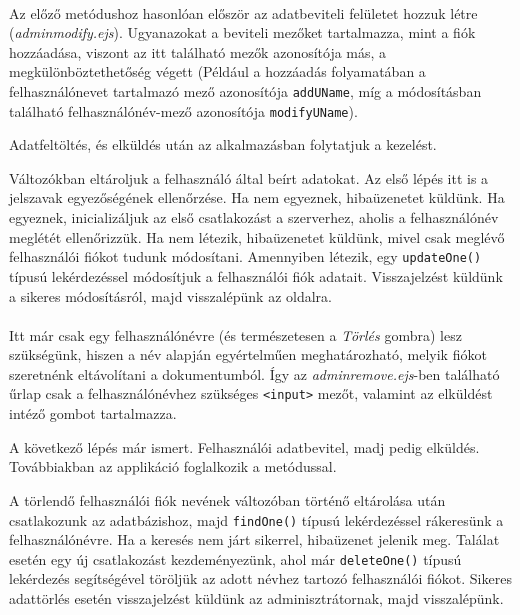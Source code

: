 \\

Az előző metódushoz hasonlóan először az adatbeviteli felületet hozzuk létre (\textit{adminmodify.ejs}). Ugyanazokat a beviteli mezőket tartalmazza, mint a fiók hozzáadása, viszont az itt található mezők azonosítója más, a megkülönböztethetőség végett (Például a hozzáadás folyamatában a felhasználónevet tartalmazó mező azonosítója \texttt{addUName}, míg a módosításban található felhasználónév-mező azonosítója \texttt{modifyUName}).

Adatfeltöltés, és elküldés után az alkalmazásban folytatjuk a kezelést.

Változókban eltároljuk a felhasználó által beírt adatokat. Az első lépés itt is a jelszavak egyezőségének ellenőrzése. Ha nem egyeznek, hibaüzenetet küldünk. Ha egyeznek, inicializáljuk az első csatlakozást a szerverhez, aholis a felhasználónév meglétét ellenőrizzük. Ha nem létezik, hibaüzenetet küldünk, mivel csak meglévő felhasználói fiókot tudunk módosítani. Amennyiben létezik, egy \texttt{updateOne()} típusú lekérdezéssel módosítjuk a felhasználói fiók adatait. Visszajelzést küldünk a sikeres módosításról, majd visszalépünk az oldalra.\\

\\

Itt már csak egy felhasználónévre (és természetesen a \textit{Törlés} gombra) lesz szükségünk, hiszen a név alapján egyértelműen meghatározható, melyik fiókot szeretnénk eltávolítani a dokumentumból. Így az \textit{adminremove.ejs}-ben található űrlap csak a felhasználónévhez szükséges \texttt{<input>} mezőt, valamint az elküldést intéző gombot tartalmazza.

A következő lépés már ismert. Felhasználói adatbevitel, madj pedig elküldés. Továbbiakban az applikáció foglalkozik a metódussal.

A törlendő felhasználói fiók nevének változóban történő eltárolása után csatlakozunk az adatbázishoz, majd \texttt{findOne()} típusú lekérdezéssel rákeresünk a felhasználónévre. Ha a keresés nem járt sikerrel, hibaüzenet jelenik meg. Találat esetén egy új csatlakozást kezdeményezünk, ahol már \texttt{deleteOne()} típusú lekérdezés segítségével töröljük az adott névhez tartozó felhasználói fiókot. Sikeres adattörlés esetén visszajelzést küldünk az adminisztrátornak, majd visszalépünk.


